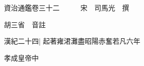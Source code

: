 






























































資治通鑑卷三十二　　　宋　司馬光　撰

胡三省　音註

漢紀二十四|{
	起著雍涒灘盡昭陽赤奮若凡六年}


孝成皇帝中

